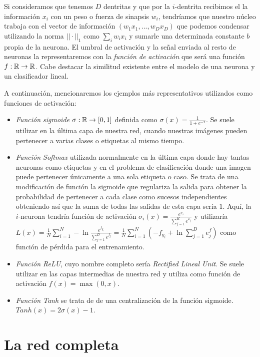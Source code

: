 Si consideramos que tenemos $D$ dentritas y que por la $i$-dentrita recibimos el la información $x_i$ con un peso o fuerza de sinapsis $w_i$, tendríamos que nuestro núcleo trabaja con el vector de información $(w_1 x_1,...,w_D x_D)$ que podemos condensar utilizando la norma $||\cdot ||_1$ como $\sum_i w_i x_i $ y sumarle una determinada constante $b$ propia de la neurona. El umbral de activación y la señal enviada al resto de neuronas la representaremos con la \emph{función de activación}\label{def:ActivationFunction} que será una función $f: \mathbb{R} \to \mathbb{R}$. Cabe destacar la similitud existente entre el modelo de una neurona y un clasificador lineal.\newline

A continuación, mencionaremos los ejemplos más representativos utilizados como funciones de activación:

\begin{itemize}
\item \emph{Función sigmoide} $\sigma: \mathbb{R} \to [0,1]$ definida como $\sigma(x)=\frac{1}{1+e^{-x}} $. Se suele utilizar en la última capa de nuestra red, cuando nuestras imágenes pueden pertenecer a varias clases o etiquetas al mismo tiempo.
\item \emph{Función Softmax} utilizada normalmente en la última capa donde hay tantas neuronas como etiquetas y en el problema de clasificación donde una imagen puede pertenecer únicamente a una sola etiqueta o caso. Se trata de una modificación de función la sigmoide que regulariza la salida para obtener la probabilidad de pertenecer a cada clase como sucesos independientes obteniendo así que la suma de todas las salidas de esta capa sería $1$. Aquí, la $i$-neurona tendría función de activación $\sigma_i(x)=\frac{e^{x_i}}{\sum_{j=1}^K e^{x_j}}$ y utilizaría $L(x)=\frac{1}{N}\sum_{i=1}^N -\ln \frac{e^{f_{y_i}}}{\sum_{j=1}^D e^{f_j}}=\frac{1}{N}\sum_{i=1}^N (-{f_{y_i}}+\ln \sum_{j=1}^D e^f_j)$ como función de pérdida para el entrenamiento.
\item \emph{Función ReLU}, cuyo nombre completo sería \emph{Rectified Lineal Unit}. Se suele utilizar en las capas intermedias de nuestra red y utiliza como función de activación $f(x)=\max(0,x)$.
\item \emph{Función Tanh} se trata de de una centralización de la función sigmoide. $Tanh(x)=2\sigma(x)-1$.
\end{itemize}

\section{La red completa}

